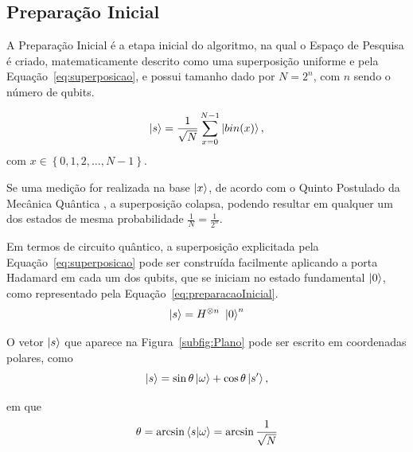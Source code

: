 

\subsection{Preparaç\~{a}o Inicial}
\label{subsec:prepInicialAlg}

A Preparaç\~{a}o Inicial \'{e} a etapa inicial do algoritmo, na qual o Espaço de Pesquisa \'{e} criado, matematicamente descrito como uma superposiç\~{a}o uniforme e pela Equaç\~{a}o~\ref{eq:superposicao}, e possui tamanho dado por $N = 2^n$, com $n$ sendo o n\'{u}mero de qubits.

\begin{equation}
    \ket{s} = \frac{1}{\sqrt{N}}\sum_{x = 0}^{N - 1} \ket{bin(x)},
    \label{eq:superposicao}
\end{equation}
%
com $x \in \left\{ 0, 1, 2, \ldots, N-1 \right\}$.

Se uma mediç\~{a}o for realizada na base $\ket{x}$, de acordo com o Quinto Postulado da Mec\^{a}nica Qu\^{a}ntica \cite{vonNuemann1955_QuMec}, a superposiç\~{a}o colapsa, podendo resultar em qualquer um dos estados de mesma probabilidade $\frac{1}{N} = \frac{1}{2^n}$. 

Em termos de circuito qu\^{a}ntico, a superposiç\~{a}o explicitada pela Equaç\~{a}o~\ref{eq:superposicao} pode ser constru\'{i}da facilmente aplicando a porta Hadamard em cada um dos qubits, que se iniciam no estado fundamental $\ket{0}$, como representado pela Equaç\~{a}o~\ref{eq:preparacaoInicial}.
%
\begin{equation}
    \ket{s} = H^{\otimes n}~\ket{0}^n
    \label{eq:preparacaoInicial}
\end{equation}

O vetor $\ket{s}$ que aparece na Figura~\ref{subfig:Plano} pode ser escrito em coordenadas polares, como
%
\begin{equation}
    \ket{s} = \sin{\theta}\ket{\omega} + \cos{\theta}\ket{s'},
    \label{eq:estadoCoordPolar}
\end{equation}

em que 
%
\begin{equation}
    \theta = \arcsin{\braket{s|\omega}} = \arcsin{\frac{1}{\sqrt{N}}}
    \label{eq:thetaValue}
\end{equation}

